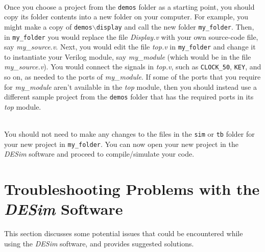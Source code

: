 \documentclass[epsfig,10pt,fullpage]{article} \addtolength{\textwidth}{1.5in}
\begin{document}
~\\
Once you choose a project from the \texttt{demos} folder as a starting point, you should
copy its folder contents into a new folder on your computer. For example, you might make a copy of
\texttt{demos$\backslash$display} and call the new folder \texttt{my\_folder}. Then, in
\texttt{my\_folder} you would replace the file {\it Display.v} with your own source-code 
file, say {\it my\_source.v}. Next, you would edit the file {\it top.v} in \texttt{my\_folder} 
and change it to instantiate your Verilog module, say {\it my\_module} (which would be in
the file {\it my\_source.v}). You would connect 
the signals in {\it top.v}, such as \texttt{CLOCK\_50}, \texttt{KEY}, and so on, 
as needed to the ports of {\it my\_module}. If some of the ports that you require for 
{\it my\_module} aren't available in the {\it top} module, then you should instead use
a different sample project from the \texttt{demos} folder that has the required 
ports in its {\it top} module.  

~\\
You should not need to make any changes to the files in the \texttt{sim} or \texttt{tb} folder 
for your new project in \texttt{my\_folder}. You can now open your new project in the
{\it DESim} software and proceed to compile/simulate your code. 

\newpage
\section*{Troubleshooting Problems with the {\it DESim} Software}

This section discusses some potential issues that could be encountered while using the
{\it DESim} software, and provides suggested solutions.
\end{document}
